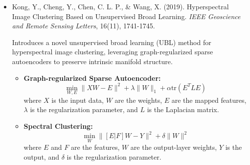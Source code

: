 \documentclass[10pt,svgnames,fragile]{beamer}
\begin{document}
\begin{frame}
\tiny
\begin{itemize}
\item Kong, Y., Cheng, Y., Chen, C. L. P., \& Wang, X. (2019). Hyperspectral Image Clustering Based on Unsupervised Broad Learning. \textit{IEEE Geoscience and Remote Sensing Letters}, 16(11), 1741-1745. \href{https://doi.org/10.1109/LGRS.2019.2907598}{\color{blue}{DOI: 10.1109/LGRS.2019.2907598}} \cite{kongHyperspectralImageClustering2019}

{\color{gray}Introduces a novel unsupervised broad learning (UBL) method for hyperspectral image clustering, leveraging graph-regularized sparse autoencoders to preserve intrinsic manifold structure.}
\begin{itemize} \tiny
    \item \textbf{Graph-regularized Sparse Autoencoder:}
    \[
    \min_{W, E} \|XW - E\|^2 + \lambda \|W\|_1 + \alpha \text{tr}(E^T L E)
    \]
    where \(X\) is the input data, \(W\) are the weights, \(E\) are the mapped features, \(\lambda\) is the regularization parameter, and \(L\) is the Laplacian matrix.

    \item \textbf{Spectral Clustering:}
    \[
    \min_{W} \|[E|F]W - Y\|^2 + \delta \|W\|^2
    \]
    where \(E\) and \(F\) are the features, \(W\) are the output-layer weights, \(Y\) is the output, and \(\delta\) is the regularization parameter.
\end{itemize}

\end{itemize}
\end{frame}
\end{document}
